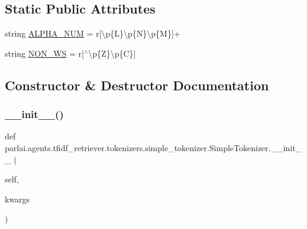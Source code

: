 \subsection*{Static Public Attributes}
\begin{DoxyCompactItemize}
\item 
string \hyperlink{classparlai_1_1agents_1_1tfidf__retriever_1_1tokenizers_1_1simple__tokenizer_1_1SimpleTokenizer_a05623c8143b625ce794a3575065a485f}{A\+L\+P\+H\+A\+\_\+\+N\+UM} = r\textquotesingle{}\mbox{[}\textbackslash{}p\{L\}\textbackslash{}p\{N\}\textbackslash{}p\{M\}\mbox{]}+\textquotesingle{}
\item 
string \hyperlink{classparlai_1_1agents_1_1tfidf__retriever_1_1tokenizers_1_1simple__tokenizer_1_1SimpleTokenizer_a317087dd1dd245f051472def2190d889}{N\+O\+N\+\_\+\+WS} = r\textquotesingle{}\mbox{[}$^\wedge$\textbackslash{}p\{Z\}\textbackslash{}p\{C\}\mbox{]}\textquotesingle{}
\end{DoxyCompactItemize}


\subsection{Constructor \& Destructor Documentation}
\mbox{\label{classparlai_1_1agents_1_1tfidf__retriever_1_1tokenizers_1_1simple__tokenizer_1_1SimpleTokenizer_a6a038fd66269e0a8e76e62260b13f4d9}} 
\subsubsection{\texorpdfstring{\+\_\+\+\_\+init\+\_\+\+\_\+()}{\_\_init\_\_()}}
{\footnotesize\ttfamily def parlai.\+agents.\+tfidf\+\_\+retriever.\+tokenizers.\+simple\+\_\+tokenizer.\+Simple\+Tokenizer.\+\_\+\+\_\+init\+\_\+\+\_\+ (\begin{DoxyParamCaption}\item[{}]{self,  }\item[{}]{kwargs }\end{DoxyParamCaption})}

